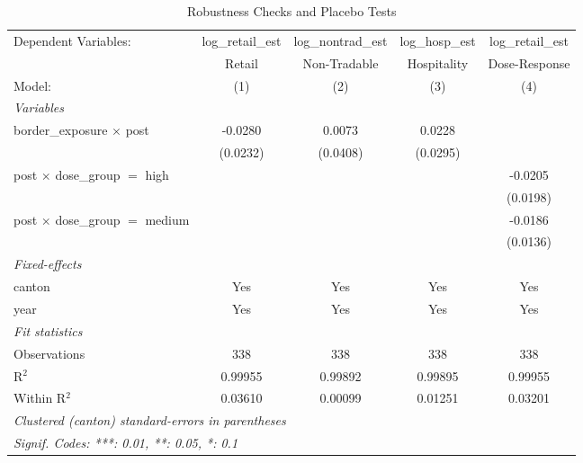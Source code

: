 
\begin{table}[htbp]
   \caption{\label{tab:robustness} Robustness Checks and Placebo Tests}
   \centering
   \begin{adjustbox}{max width=\textwidth}
   \begin{tabular}{lcccc}
      \tabularnewline \midrule \midrule
      Dependent Variables:                   & log\_retail\_est   & log\_nontrad\_est   & log\_hosp\_est   & log\_retail\_est\\    
                                             & Retail             & Non-Tradable        & Hospitality      & Dose-Response \\   
      Model:                                 & (1)                & (2)                 & (3)              & (4)\\  
      \midrule
      \emph{Variables}\\
      border\_exposure $\times$ post         & -0.0280            & 0.0073              & 0.0228           &   \\   
                                             & (0.0232)           & (0.0408)            & (0.0295)         &   \\   
      post $\times$ dose\_group $=$ high     &                    &                     &                  & -0.0205\\   
                                             &                    &                     &                  & (0.0198)\\   
      post $\times$ dose\_group $=$ medium   &                    &                     &                  & -0.0186\\   
                                             &                    &                     &                  & (0.0136)\\   
      \midrule
      \emph{Fixed-effects}\\
      canton                                 & Yes                & Yes                 & Yes              & Yes\\  
      year                                   & Yes                & Yes                 & Yes              & Yes\\  
      \midrule
      \emph{Fit statistics}\\
      Observations                           & 338                & 338                 & 338              & 338\\  
      R$^2$                                  & 0.99955            & 0.99892             & 0.99895          & 0.99955\\  
      Within R$^2$                           & 0.03610            & 0.00099             & 0.01251          & 0.03201\\  
      \midrule \midrule
      \multicolumn{5}{l}{\emph{Clustered (canton) standard-errors in parentheses}}\\
      \multicolumn{5}{l}{\emph{Signif. Codes: ***: 0.01, **: 0.05, *: 0.1}}\\
   \end{tabular}
   \end{adjustbox}


\end{table}

